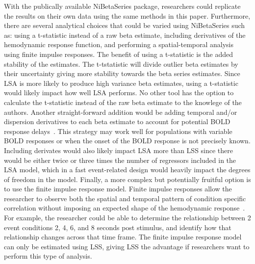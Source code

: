 \documentclass[10pt,letterpaper]{article}
\begin{document}
With the publically available NiBetaSeries package, researchers could replicate the
results on their own data using the same methods in this paper.
Furthermore, there are several analytical choices that could be varied using NiBetaSeries such as:
using a t-statistic instead of a raw beta estimate, including derivatives of the hemodynamic response function,
and performing a spatial-temporal analysis using finite impulse responses.
The benefit of using a t-statistic is the added stability of the estimates.
The t-tstatistic will divide outlier beta estimates by their uncertainty giving more stability
towards the beta series estimates.
Since LSA is more likely to produce high variance beta estimates, using a t-statistic would likely impact
how well LSA performs.
No other tool has the option to calculate the t-statistic instead of the raw beta estimate to the knowlege
of the authors.
Another straight-forward addition would be adding temporal and/or dispersion derivatives to each beta
estimate to account for potential BOLD response delays~\cite{Calhoun2004,Gottlich2015}.
This strategy may work well for populations with variable BOLD responses or when the onset of the BOLD
response is not precisely known.
Including derivates would also likely impact LSA more than LSS since there would be either twice or
three times the number of regressors included in the LSA model, which in a fast event-related design
would heavily impact the degrees of freedom in the model.
Finally, a more complex but potentially fruitful option is to use the finite impulse response model.
Finite impulse responses allow the researcher to observe both the spatial and temporal pattern of
condition specific correlation without imposing an expected shape of the hemodynamic response~\cite{Turner2012a}.
For example, the researcher could be able to determine the relationship between 2 event conditions
2, 4, 6, and 8 seconds post stimulus, and identify how that relationship changes across
that time frame.
The finite impulse response model can only be estimated using LSS, giving LSS the advantage if researchers
want to perform this type of analysis.
\end{document}
